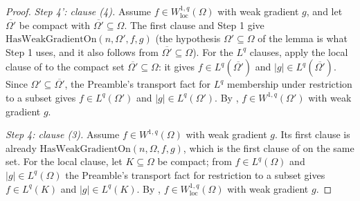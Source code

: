 \begin{proof}
\emph{Step 4': clause (4).}  Assume $f\in W^{1,q}_{\mathrm{loc}}(\Omega)$ with
weak gradient $g$, and let $\overline{\Omega'}$ be compact with
$\overline{\Omega'}\subseteq\Omega$.  The first clause and Step 1 give
$\mathrm{HasWeakGradientOn}(n,\Omega',f,g)$ (the hypothesis
$\Omega'\subseteq\Omega$ of the lemma is what Step 1 uses, and it also follows
from $\overline{\Omega'}\subseteq\Omega$).  For the $L^q$ clauses, apply the
local clause of  to the compact set
$\overline{\Omega'}\subseteq\Omega$: it gives $f\in L^q(\overline{\Omega'})$ and
$|g|\in L^q(\overline{\Omega'})$.  Since $\Omega'\subseteq\overline{\Omega'}$,
the Preamble's transport fact for $L^q$ membership under restriction to a subset
gives $f\in L^q(\Omega')$ and $|g|\in L^q(\Omega')$.  By ,
$f\in W^{1,q}(\Omega')$ with weak gradient $g$.

\emph{Step 4: clause (3).}  Assume $f\in W^{1,q}(\Omega)$ with weak gradient
$g$.  Its first clause is already
$\mathrm{HasWeakGradientOn}(n,\Omega,f,g)$, which is the first clause of
 on the same set.  For the local clause, let
$K\subseteq\Omega$ be compact; from $f\in L^q(\Omega)$ and $|g|\in L^q(\Omega)$
the Preamble's transport fact for restriction to a subset gives $f\in L^q(K)$
and $|g|\in L^q(K)$.  By ,
$f\in W^{1,q}_{\mathrm{loc}}(\Omega)$ with weak gradient $g$.
\end{proof}
